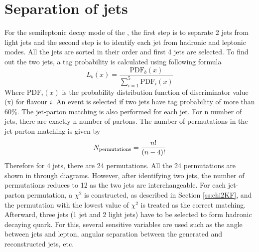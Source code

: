 \section{Separation of jets}
\label{ss:jetSepKF} 
For the semileptonic decay mode of the \ttbar, the first step is to separate 2 
\PQb jets from light jets and the second step is to identify each \PQb jet from hadronic 
and leptonic modes.  All the jets are sorted in their \pt order and first 4 jets are
selected. To find out the two \PQb jets, a \PQb tag probability is calculated using 
following formula \cite{DHondt:2006iej}
\begin{equation}
	L_{b}(x) = \frac{\text{PDF}_b(x)}{\sum_{i=1}^5 \text{PDF}_i(x)}
\end{equation}
Where $\text{PDF}_i(x)$ is the probability distribution function of \PQb discriminator value
(x) for flavour $i$. An event is selected if two jets have \PQb tag probability of more 
than 60\%. The jet-parton matching is also performed for each jet. For n number of 
jets, there are exactly n number of partons. The number of permutations in the 
jet-parton matching is given by
\begin{equation}
	N_{\rm{permutations}} = \frac{n!}{(n-4)!}
\end{equation}
Therefore for 4 jets, there are 24 permutations. All the 24 permutations are shown 
in \cite{KinFitThesis} through diagrams. However, after identifying two \PQb jets, the number of 
permutations reduces to 12 as the two \PQb jets are interchangeable. For each 
jet-parton permutation, a $\chi^2$ is constructed, as described in Section
\ref{ss:chi2KF}, and the permutation with the lowest value of $\chi^2$ is
treated as the correct matching. Afterward, three jets (1 \PQb jet and 2 light jets) 
have to be selected to form hadronic decaying \PQt quark. For this, several sensitive 
variables are used \cite{DHondt:2006iej} such as the angle between jets and lepton, 
angular separation between the generated and reconstructed jets, etc.

